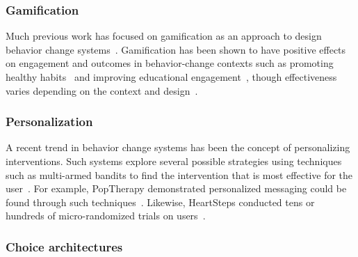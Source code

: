 \subsubsection{Gamification}

Much previous work has focused on gamification as an approach to design behavior change systems~\cite{deterding2011game}. Gamification has been shown to have positive effects on engagement and outcomes in behavior-change contexts such as promoting healthy habits~\cite{cugelman2013gamification, lyons2014behavior} and improving  educational engagement~\cite{anderson2013steering, anderson2014engaging}, though effectiveness varies depending on the context and design~\cite{6758978}. %


\subsubsection{Personalization}

A recent trend in behavior change systems has been the concept of personalizing interventions. Such systems explore several possible strategies using techniques such as multi-armed bandits to find the intervention that is most effective for the user~\cite{paredes2014poptherapy, rabbi2014automated}. For example, PopTherapy demonstrated personalized messaging could be found through such techniques~\cite{paredes2014poptherapy}. Likewise, HeartSteps conducted tens or hundreds of micro-randomized trials on users~\cite{doi:10.1111/j.1740-9713.2015.00863.x}.  %

\subsubsection{Choice architectures}

